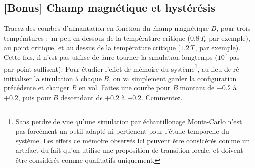 \documentclass{book}
\begin{document}
\subsection{[Bonus] Champ magnétique et hystérésis}

Tracez des courbes d'aimantation en fonction du champ magnétique $B$, pour trois températures : un peu en dessous de la température critique ($0.8\,T_\text{c}$ par exemple), au point critique, et au dessus de la température critique ($1.2\,T_\text{c}$ par exemple). Cette fois, il n'est pas utilise de faire tourner la simulation longtemps ($10^7$ pas par point suffisent). Pour étudier l'effet de mémoire du système\footnote{Sans perdre de vue qu'une simulation par échantillonage Monte-Carlo n'est pas forcément un outil adapté ni pertienent pour l'étude temporelle du système. Les effets de mémoire observés ici peuvent être considérés comme un artefact du fait qu'on utilise une proposition de transition locale, et doivent être considérés comme qualitatifs uniquement.}, au lieu de ré-initialiser la simulation à chaque $B$, on va simplement garder la configuration précédente et changer $B$ en vol. Faites une courbe pour $B$ montant de $-0.2$ à $+0.2$, puis pour $B$ descendant de $+0.2$ à $-0.2$. Commentez.
\end{document}
